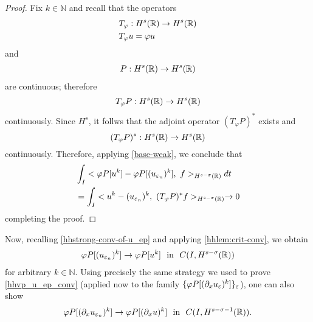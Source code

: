 \begin{proof} 
Fix $k \in \mathbb{N}$ and recall that the operators 
\begin{equation*}
\begin{split}
& T_\varphi: H^s(\mathbb{R}) \to H^s(\mathbb{R})\\
& T_\varphi u = \varphi u
\end{split}
\end{equation*}
and 
\begin{equation*}
\begin{split}
P:H^s(\mathbb{R}) \to H^s(\mathbb{R})
\end{split}
\end{equation*}
are continuous; therefore 
\begin{equation*}
\begin{split}
T_\varphi P: H^s(\mathbb{R}) \to H^s(\mathbb{R})
\end{split}
\end{equation*}
continuously. Since $H^{s}$, it follws that the adjoint operator $(T_\varphi P)^*$
exists and
\begin{equation*}
(T_\varphi P)^*: H^s(\mathbb{R}) \to H^s(\mathbb{R}) 
\end{equation*}
continuously. Therefore, applying \eqref{base-weak}, we conclude that
\begin{equation}
\label{widpseudo}
\begin{split}
& \int_I <\varphi P[u^k] - \varphi
P [(u_{\varepsilon_n})^k],\  f>_{H^{s-\sigma }(\mathbb{R})} dt
\\
&= \int_I <u^k - 
(u_{\varepsilon_n})^k, \ (T_\varphi P)^* f>_{H^{s-\sigma }(\mathbb{R})} \to 0
\end{split}
\end{equation}
completing the proof. 
\end{proof}
%
%
Now, recalling \eqref{hhstrong-conv-of-u_ep} and applying \cref{hhlem:crit-conv}, we obtain
\begin{equation}
\begin{split}
\varphi P [(u_{\varepsilon_n})^k] \to \varphi P [u^k] \ \ \text{in}  \ \ C(I,
H^{s-\sigma}(\mathbb{R}))
\label{hhvp_u_ep_conv}
\end{split}
\end{equation}
for arbitrary $k \in \mathbb{N}$.  Using precisely the same
strategy we used to prove \eqref{hhvp_u_ep_conv} (applied now to
the family $\{ \varphi P [(\partial_x u_{\varepsilon})^k] \}_\varepsilon$), one can also show
\begin{equation}
\begin{split}
\vp P [ (\p_x u_{\ee_n})^k] \to \vp P [(\p_x u)^k] \ \ \text{in}  \ \ C(I,
H^{s-\sigma -1 }(\rr)).
\end{split}
\end{equation}

